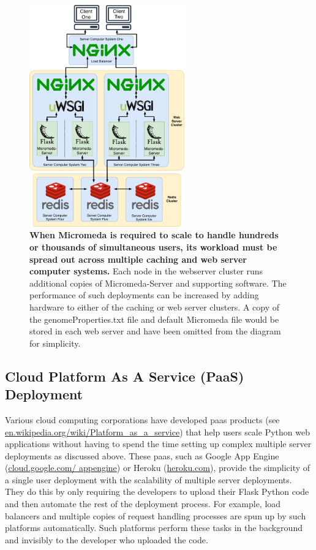 \begin{figure}[!ht]
  \centering
	\includegraphics[width=0.60\textwidth]{media/micromeda-heavy-deployment.pdf}
	 \caption[When Micromeda is required to scale to handle hundreds or thousands of simultaneous users, its workload must be spread out across multiple caching and web server computer systems.]{\textbf{When Micromeda is required to scale to handle hundreds or thousands of simultaneous users, its workload must be spread out across multiple caching and web server computer systems.} Each node in the webserver cluster runs additional copies of Micromeda-Server and supporting software. The performance of such deployments can be increased by adding hardware to either of the caching or web server clusters.  A copy of the genomeProperties.txt file and default Micromeda file would be stored in each web server and have been omitted from the diagram for simplicity.}
	 \label{fig:micromeda-large-deploy}
\end{figure}

\subsection{Cloud Platform As A Service (PaaS) Deployment}

Various cloud computing corporations have developed \gls{paas} \cite{lawton2008developing} products (see \href{http://en.wikipedia.org/wiki/Platform_as_a_service}{en.wikipedia.org/wiki/Platform\_as\_a\_service}) that help users scale Python web applications without having to spend the time setting up complex multiple server deployments as discussed above. These \gls{paas}, such as Google App Engine (\href{http://cloud.google.com/appengine}{cloud.google.com/ appengine}) or Heroku (\href{http://heroku.com}{heroku.com}), provide the simplicity of a single user deployment with the scalability of multiple server deployments. They do this by only requiring the developers to upload their Flask Python code and then automate the rest of the deployment process. For example, load balancers and multiple copies of request handling processes are spun up by such platforms automatically. Such platforms perform these tasks in the background and invisibly to the developer who uploaded the code.

